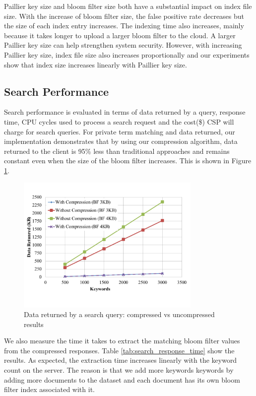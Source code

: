 Paillier key size and bloom filter size both have a substantial impact on index file size. 
With the increase of bloom filter size, the false positive rate decreases but the size of each
index entry increases. The indexing time also increases, mainly because it takes longer
to upload a larger bloom filter to the cloud. 
A larger Paillier key size can help strengthen system security. However, with
increasing Paillier key size, index file size also increases proportionally and
our experiments show that index size increases linearly with Paillier key size.

\subsection{Search Performance}

Search performance is evaluated in terms of data returned by a query, response
time, CPU cycles used to process a search request and the cost(\$) CSP will
charge for search queries. 
For private term matching and data returned, our implementation demonstrates
that by using our compression algorithm, data returned to the client
is 95\% less than traditional approaches and remains constant even when the size
of the bloom filter increases. This is shown in Figure \ref{fig:compress}.

\begin{figure}[h!]
  \centering
  \includegraphics[width= 3.5in]{figures/comp_compare.png}
  \caption{Data returned by a search query: compressed vs uncompressed results}
  \label{fig:compress}
\end{figure}

We also measure the time it takes to extract the matching bloom filter values
from the compressed responses.
Table \ref{tab:search_response_time} show the results. As expected,
the extraction time increases linearly with the keyword count
on the server. The reason is that we add more keywords
keywords by adding more documents to the dataset and each document
has its own bloom filter index associated with it.

